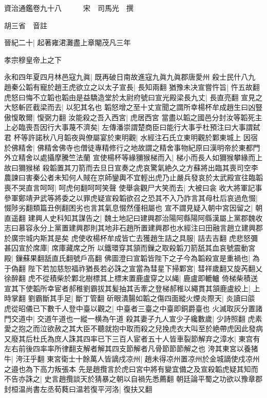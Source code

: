 資治通鑑卷九十八　　　宋　司馬光　撰

胡三省　音註

晉紀二十|{
	起著雍涒灘盡上章閹茂凡三年}


孝宗穆皇帝上之下

永和四年夏四月林邑寇九眞|{
	既再破日南故進寇九眞九眞郡唐愛州}
殺士民什八九　趙秦公韜有寵於趙王虎欲立之以太子宣長|{
	長知兩翻}
猶豫未决宣嘗忤旨|{
	忤五故翻}
虎怒曰悔不立韜也韜由是益驕造堂於太尉府號曰宣光殿梁長九丈|{
	長直亮翻}
宣見之大怒斬匠截梁而去|{
	以犯其名也}
韜怒增之至十丈宣聞之謂所幸楊杯牟成趙生曰凶豎傲愎敢爾|{
	愎弼力翻}
汝能殺之吾入西宮|{
	虎居西宮}
當盡以韜之國邑分封汝等韜死主上必臨喪吾因行大事蔑不濟矣|{
	左傳潘崇謂楚商臣曰能行大事乎杜預注曰大事謂弑君}
杯等許諾秋八月韜夜與僚屬宴於東明觀|{
	水經注石氏立東明觀於鄴東城上}
因宿於佛精舍|{
	佛精舍佛寺也僧徒專精修行之地故謂之精舍事物紀原曰漢明帝於東都門外立精舍以處攝摩騰竺法蘭}
宣使楊杯等緣獼猴梯而入|{
	梯小而長人如獮猴攀緣而上故曰獮猴梯}
殺韜置其刀箭而去旦日宣奏之虎哀驚氣絶久之方蘇將出臨其喪司空李農諫曰害秦公者未知何人賊在京師鑾輿不宜輕出虎乃止嚴兵發哀於太武殿宣往臨韜喪不哭直言呵呵|{
	呵虎何翻呵呵笑聲}
使舉衾觀尸大笑而去|{
	大被曰衾}
收大將軍記事參軍鄭靖尹武等將委之以罪虎疑宣殺韜欲召之恐其不入乃詐言其母杜后哀過危惙|{
	惙陟劣翻類篇丑例翻困劣也言其氣息惙然僅相屬也}
宣不謂見疑入朝中宮因留之|{
	朝直遥翻}
建興人史科知其謀告之|{
	魏土地記曰建興郡治陽阿縣陽阿縣漢屬上黨郡魏收志曰慕容永分上黨置建興郡則其地非石趙所置建興郡也水經注曰田融言趙立建興郡於廣宗城内斯其是矣}
虎使收楊杯牟成皆亡去獲趙生詰之具服|{
	詰去吉翻}
虎悲怒彌甚囚宣於席庫|{
	席庫藏席之所}
以鐵環穿其頷而鏁之取殺韜刀箭舐其血哀號震動宮殿|{
	鏁蘇果翻舐直氏翻號戶高翻}
佛圖澄曰宣韜皆陛下之子今為韜殺宣是重禍也|{
	為于偽翻}
陛下若加慈恕福祚猶長若必誅之宣當為彗星下掃鄴宮|{
	彗祥歲翻又旋芮翻乂徐醉翻}
虎不從積柴於鄴北樹標其上標末置鹿盧穿之以䋲|{
	鹿盧即轆轤}
倚梯柴積送宣其下使韜所幸宦者郝稚劉霸拔其髪抽其舌牽之登梯郝稚以繩貫其頷鹿盧絞上|{
	上時掌翻}
劉霸斷其手足|{
	斷丁管翻}
斫眼潰腸如韜之傷四面縱火煙炎際天|{
	炎讀曰燄}
虎從昭儀已下數千人登中臺以觀之|{
	中臺者三臺之中臺即銅爵臺也}
火滅取灰分置諸門交道中|{
	交道午道也一縱一横為午道}
殺其妻子九人宣少子纔數歲|{
	少詩照翻}
虎素愛之抱之而泣欲赦之其大臣不聽就抱中取而殺之兒挽虎衣大叫至於絶帶虎因此發病又廢其后杜氏為庶人誅其四率已下三百人宦者五十人皆車裂節解弃之漳水|{
	東宫有左右前後四率率所律翻支解者解其四支節解者凡骨節節節解之也}
洿其東宮以養猪牛|{
	洿汪乎翻}
東宮衛士十餘萬人皆謫戍凉州|{
	趙未得凉州置凉州於金城謫使戍凉州之邉也為下高力叛張本}
先是趙攬言於虎曰宮中將有變宜備之及宣殺韜虎疑其知而不告亦誅之|{
	史言趙攬談天於猜暴之朝以自禍先悉薦翻}
朝廷論平蜀之功欲以豫章郡封桓温尚書左丞荀蕤曰温若復平河洛|{
	復扶又翻}
